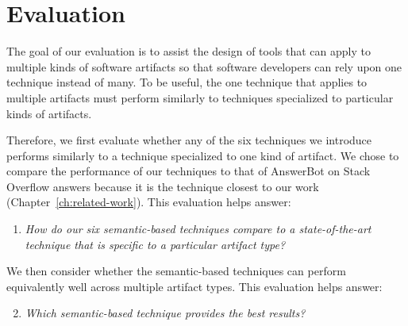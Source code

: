
\section{Evaluation}
\label{cp5:evaluation}



The goal of our evaluation is to assist the design of tools that
can apply to multiple kinds of software artifacts
so that software developers can rely upon
one technique instead of many. To be useful, the one technique
that applies to multiple artifacts must 
perform similarly to techniques specialized
to particular kinds of artifacts.


Therefore, we first evaluate whether any of the
six techniques we introduce performs
similarly to a technique specialized to one
kind of artifact. We chose to compare
the performance of our techniques to
that of AnswerBot on Stack Overflow
answers because it is the technique closest to our work (Chapter~\ref{ch:related-work}). This
evaluation helps answer: 


\begin{enumerate}[label=\textit{RQ\arabic*},leftmargin=*]

    \item  \textit{How do our six semantic-based techniques compare to a state-of-the-art technique that is specific to a particular artifact type?} 

\end{enumerate}







We then consider whether the semantic-based
techniques can perform equivalently well across
multiple artifact types.
This evaluation helps answer:




\begin{enumerate}[label=\textit{RQ\arabic*},leftmargin=*]
    \setcounter{enumi}{1}

    \item  \textit{Which semantic-based technique provides the best results?} 

\end{enumerate}






